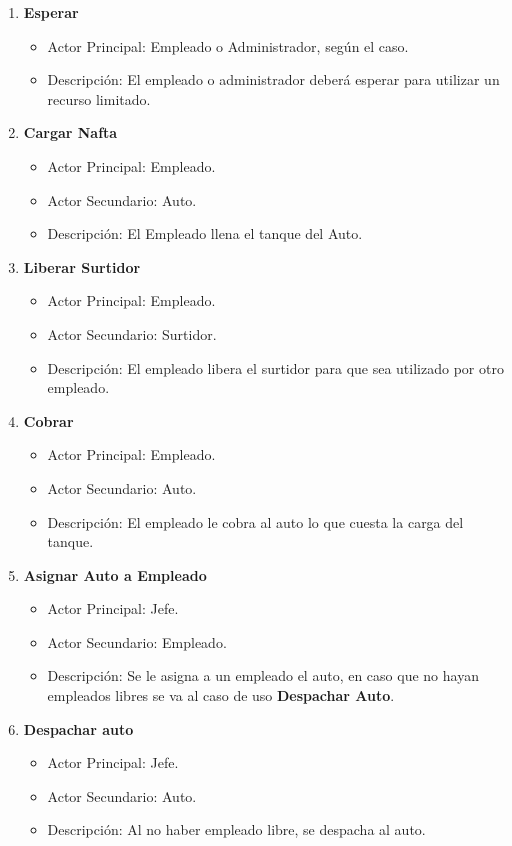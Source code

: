 \documentclass[a4paper,12pt]{article}
\begin{document}
\begin{enumerate}
	\item \textbf{Esperar}
	\begin{itemize}
		\item Actor Principal: Empleado o Administrador, según el caso.
		\item Descripción: El empleado o administrador deberá esperar para utilizar un recurso limitado.
	\end{itemize}
	
	\item \textbf{Cargar Nafta}
	\begin{itemize}
		\item Actor Principal: Empleado.
		\item Actor Secundario: Auto.
		\item Descripción: El Empleado llena el tanque del Auto.
	\end{itemize}			

	\item \textbf{Liberar Surtidor}
	\begin{itemize}
		\item Actor Principal: Empleado.
		\item Actor Secundario: Surtidor.
		\item Descripción: El empleado libera el surtidor para que sea utilizado por otro empleado.
	\end{itemize}	
	
	\item \textbf{Cobrar}
	\begin{itemize}
		\item Actor Principal: Empleado.
		\item Actor Secundario: Auto.
		\item Descripción: El empleado le cobra al auto lo que cuesta la carga del tanque.
	\end{itemize}	
	
	\item \textbf{Asignar Auto a Empleado}
	\begin{itemize}
		\item Actor Principal: Jefe.
		\item Actor Secundario: Empleado.
		\item Descripción: Se le asigna a un empleado el auto, en caso que no hayan empleados libres se 
		va al caso de uso \textbf{Despachar Auto}.
	\end{itemize}	
	
\newpage

	\item \textbf{Despachar auto}
	\begin{itemize}
		\item Actor Principal: Jefe.
		\item Actor Secundario: Auto.
		\item Descripción: Al no haber empleado libre, se despacha al auto.
	\end{itemize}	
	

\end{enumerate}
\end{document}
